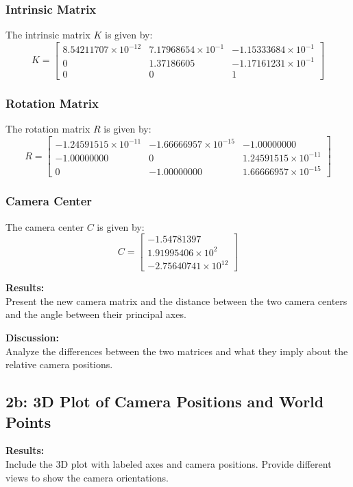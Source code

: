 \documentclass{article}
\begin{document}
\subsubsection*{Intrinsic Matrix}

The intrinsic matrix \( K \) is given by:
\[
K = \begin{bmatrix}
8.54211707 \times 10^{-12} & 7.17968654 \times 10^{-1} & -1.15333684 \times 10^{-1} \\
0 & 1.37186605 & -1.17161231 \times 10^{-1} \\
0 & 0 & 1
\end{bmatrix}
\]

\subsubsection*{Rotation Matrix}

The rotation matrix \( R \) is given by:
\[
R = \begin{bmatrix}
-1.24591515 \times 10^{-11} & -1.66666957 \times 10^{-15} & -1.00000000 \\
-1.00000000 & 0 & 1.24591515 \times 10^{-11} \\
0 & -1.00000000 & 1.66666957 \times 10^{-15}
\end{bmatrix}
\]

\subsubsection*{Camera Center}

The camera center \( C \) is given by:
\[
C = \begin{bmatrix}
-1.54781397 \\
1.91995406 \times 10^2 \\
-2.75640741 \times 10^{12}
\end{bmatrix}
\]

\textbf{Results:} \\
Present the new camera matrix and the distance between the two camera centers and the angle between their principal axes.

\textbf{Discussion:} \\
Analyze the differences between the two matrices and what they imply about the relative camera positions.

\subsection{2b: 3D Plot of Camera Positions and World Points}
\textbf{Results:} \\
Include the 3D plot with labeled axes and camera positions. Provide different views to show the camera orientations.
\end{document}
